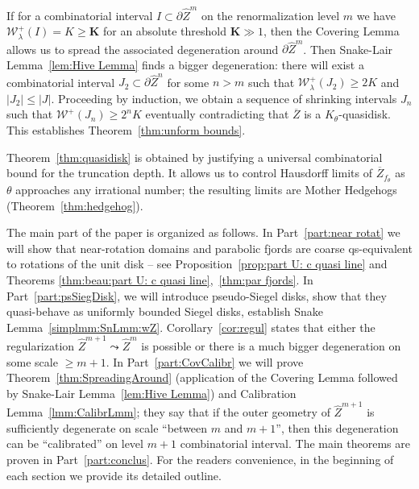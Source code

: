 \documentclass{amsart}
\newcommand{\1}{{\mathbb 1 }}
\newcommand{\Width}{{\mathcal W}}
\newcommand{\wZ}{{\widehat Z}}
\newcommand{\bK}{{\mathbf K}}
\theoremstyle{remark}
\numberwithin{equation}{section}
\theoremstyle{definition}
\begin{document}
If for a combinatorial interval $I\subset \partial \wZ^m$ on the renormalization level $m$ we have $\Width^+_\lambda(I)=K\ge \bK$ for an absolute threshold $\bK\gg 1$, then the Covering Lemma allows us to spread the associated degeneration around $\partial \wZ^m$. Then Snake-Lair Lemma~\ref{lem:Hive Lemma} finds a bigger degeneration: there will exist a combinatorial interval $J_2\subset \partial \wZ^n$ for some $n>m$ such that $\Width^+_\lambda(J_2)\ge 2K$ and $|J_2|\le |J|$. Proceeding by induction, we obtain a sequence of shrinking intervals $J_n$ such that $\Width^+(J_n) \ge 2^nK$ eventually contradicting that $\overline Z$ is a $K_\theta$-quasidisk. This establishes Theorem~\ref{thm:unform bounds}. 

Theorem~\ref{thm:quasidisk} is obtained by justifying a universal combinatorial bound for the truncation depth. It allows us to control Hausdorff limits of $\overline Z_{f_\theta}$ as $\theta$ approaches any irrational number; the resulting limits are Mother Hedgehogs (Theorem~\ref{thm:hedgehog}).

The main part of the paper is organized as follows. In Part~\ref{part:near rotat} we will show that near-rotation domains and parabolic fjords are coarse qs-equivalent to rotations of the unit disk -- see Proposition~\ref{prop:part U: c quasi line} and Theorems \ref{thm:beau:part U: c quasi line},~\ref{thm:par fjords}. In Part~\ref{part:psSiegDisk}, we will introduce pseudo-Siegel disks, show that they quasi-behave as uniformly bounded Siegel disks, establish Snake Lemma~\ref{simplmm:SnLmm:wZ}. Corollary~\ref{cor:regul} states that either the regularization $\wZ^{m+1}\leadsto \wZ^{m}$ is possible or there is a much bigger degeneration on some scale $\ge m+1$. In Part~\ref{part:CovCalibr} we will prove Theorem~\ref{thm:SpreadingAround} (application of the Covering Lemma followed by Snake-Lair Lemma~\ref{lem:Hive Lemma}) and Calibration Lemma~\ref{lmm:CalibrLmm}; they say that if the outer geometry of $\wZ^{m+1}$ is sufficiently degenerate on scale ``between $m$ and $m+1$'', then this degeneration can be ``calibrated'' on level $m+1$ combinatorial interval. The main theorems are proven in Part~\ref{part:conclus}. For the readers convenience, in the beginning of each section we provide its detailed outline.

\end{document}
